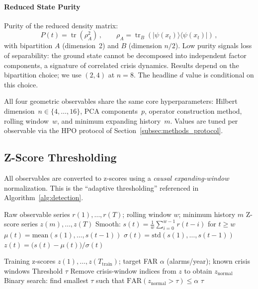 \documentclass[3p]{elsarticle}
\newcommand{\ket}[1]{|#1\rangle}
\newcommand{\bra}[1]{\langle#1|}
\newcommand{\tr}{\operatorname{tr}}
\begin{document}
\paragraph{Reduced State Purity}
Purity of the reduced density matrix:
\begin{equation}\label{eq:reduced_purity}
  P(t) = \tr(\rho_A^2)\,,\qquad \rho_A = \tr_B(\ket{\psi(x_t)}\bra{\psi(x_t)})\,,
\end{equation}
with bipartition $A$ (dimension~2) and $B$ (dimension $n/2$).
Low purity signals loss of separability: the ground state cannot be
decomposed into independent factor components, a signature of
correlated crisis dynamics.  Results depend on the bipartition
choice; we use $(2, 4)$ at $n = 8$.  The headline $d$ value is
conditional on this choice.


\noindent All four geometric observables share the same core
hyperparameters: Hilbert dimension~$n \in \{4,\ldots,16\}$, PCA
components~$p$, operator construction method, rolling window~$w$,
and minimum expanding history~$m$.  Values are tuned per observable
via the HPO protocol of Section~\ref{subsec:methods_protocol}.

\subsection{Z-Score Thresholding}%
\label{subsec:zscore}

All observables are converted to z-scores using a \emph{causal
expanding-window} normalization.  This is the ``adaptive thresholding''
referenced in Algorithm~\ref{alg:detection}.

\begin{algorithm}[htb]
\caption{Causal Expanding-Window Z-Score}\label{alg:zscore}
\begin{algorithmic}[1]
\Require Raw observable series $r(1), \ldots, r(T)$; rolling window
  $w$; minimum history $m$
\Ensure Z-score series $z(m), \ldots, z(T)$
\State Smooth: $s(t) = \frac{1}{w}\sum_{i=0}^{w-1} r(t-i)$ for
  $t \geq w$
  \State $\mu(t) = \mathrm{mean}(s(1), \ldots, s(t-1))$
  \State $\sigma(t) = \mathrm{std}(s(1), \ldots, s(t-1))$
  \State $z(t) = \bigl(s(t) - \mu(t)\bigr) / \sigma(t)$
\EndFor
\end{algorithmic}
\end{algorithm}

\begin{algorithm}[htb]
\caption{FAR-Calibrated Threshold}\label{alg:far}
\begin{algorithmic}[1]
\Require Training z-scores $z(1), \ldots, z(T_{\mathrm{train}})$;
  target FAR $\alpha$ (alarms/year); known crisis windows
\Ensure Threshold $\tau$
\State Remove crisis-window indices from $z$ to obtain $z_{\mathrm{normal}}$
\State Binary search: find smallest $\tau$ such that
  $\mathrm{FAR}(z_{\mathrm{normal}} > \tau) \leq \alpha$
\State \Return $\tau$
\end{algorithmic}
\end{algorithm}
\end{document}
